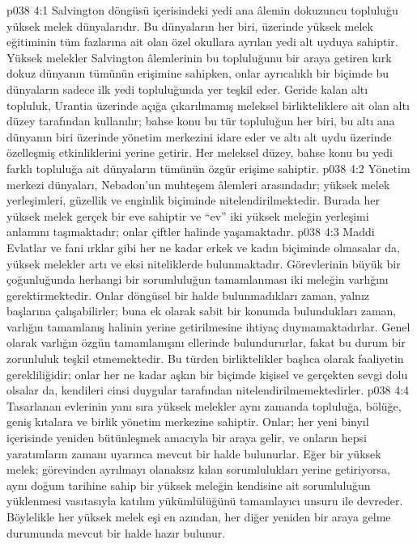 \vs p038 4:1 Salvington döngüsü içerisindeki yedi ana âlemin dokuzuncu topluluğu yüksek melek dünyalarıdır. Bu dünyaların her biri, üzerinde yüksek melek eğitiminin tüm fazlarına ait olan özel okullara ayrılan yedi alt uyduya sahiptir. Yüksek melekler Salvington âlemlerinin bu topluluğunu bir araya getiren kırk dokuz dünyanın tümünün erişimine sahipken, onlar ayrıcalıklı bir biçimde bu dünyaların sadece ilk yedi topluluğunda yer teşkil eder. Geride kalan altı topluluk, Urantia üzerinde açığa çıkarılmamış meleksel birlikteliklere ait olan altı düzey tarafından kullanılır; bahse konu bu tür topluluğun her biri, bu altı ana dünyanın biri üzerinde yönetim merkezini idare eder ve altı alt uydu üzerinde özelleşmiş etkinliklerini yerine getirir. Her meleksel düzey, bahse konu bu yedi farklı topluluğa ait dünyaların tümünün özgür erişime sahiptir.
\vs p038 4:2 Yönetim merkezi dünyaları, Nebadon’un muhteşem âlemleri arasındadır; yüksek melek yerleşimleri, güzellik ve enginlik biçiminde nitelendirilmektedir. Burada her yüksek melek gerçek bir eve sahiptir ve “ev” iki yüksek meleğin yerleşimi anlamını taşımaktadır; onlar çiftler halinde yaşamaktadır.
\vs p038 4:3 Maddi Evlatlar ve fani ırklar gibi her ne kadar erkek ve kadın biçiminde olmasalar da, yüksek melekler artı ve eksi niteliklerde bulunmaktadır. Görevlerinin büyük bir çoğunluğunda herhangi bir sorumluluğun tamamlanması iki meleğin varlığını gerektirmektedir. Onlar döngüsel bir halde bulunmadıkları zaman, yalnız başlarına çalışabilirler; buna ek olarak sabit bir konumda bulundukları zaman, varlığın tamamlanış halinin yerine getirilmesine ihtiyaç duymamaktadırlar. Genel olarak varlığın özgün tamamlanışını ellerinde bulundururlar, fakat bu durum bir zorunluluk teşkil etmemektedir. Bu türden birliktelikler başlıca olarak faaliyetin gerekliliğidir; onlar her ne kadar aşkın bir biçimde kişisel ve gerçekten sevgi dolu olsalar da, kendileri cinsi duygular tarafından nitelendirilmemektedirler.
\vs p038 4:4 Tasarlanan evlerinin yanı sıra yüksek melekler aynı zamanda topluluğa, bölüğe, geniş kıtalara ve birlik yönetim merkezine sahiptir. Onlar; her yeni binyıl içerisinde yeniden bütünleşmek amacıyla bir araya gelir, ve onların hepsi yaratımların zamanı uyarınca mevcut bir halde bulunurlar. Eğer bir yüksek melek; görevinden ayrılmayı olanaksız kılan sorumlulukları yerine getiriyorsa, aynı doğum tarihine sahip bir yüksek meleğin kendisine ait sorumluluğun yüklenmesi vasıtasıyla katılım yükümlülüğünü tamamlayıcı unsuru ile devreder. Böylelikle her yüksek melek eşi en azından, her diğer yeniden bir araya gelme durumunda mevcut bir halde hazır bulunur.
